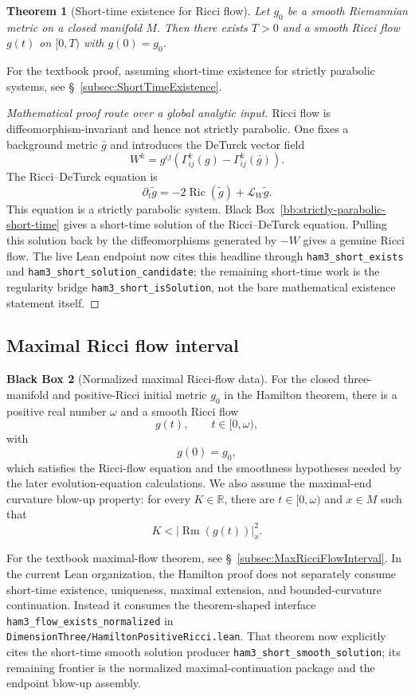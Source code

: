 \documentclass[11pt]{article}
\theoremstyle{plain}
\newtheorem{theorem}{Theorem}[section]
\theoremstyle{definition}
\newtheorem{blackbox}[theorem]{Black Box}
\theoremstyle{remark}
\newcommand{\Ric}{\operatorname{Ric}}
\newcommand{\Rm}{\operatorname{Rm}}
\newcommand{\Lie}{\mathcal L}
\newcommand{\norm}[1]{\left|#1\right|}
\newcommand{\leanref}[1]{\nolinkurl{#1}}
\newcommand{\leanfile}[1]{\nolinkurl{#1}}
\newcommand{\rffile}[1]{\leanfile{#1}}
\begin{document}
\begin{theorem}[Short-time existence for Ricci flow]
\label{thm:rf-short-time-existence}
Let $g_0$ be a smooth Riemannian metric on a closed manifold $M$. Then there
exists $T>0$ and a smooth Ricci flow $g(t)$ on $[0,T)$ with $g(0)=g_0$.
\end{theorem}

For the textbook proof, assuming short-time existence for strictly parabolic
systems, see \S~\ref{subsec:ShortTimeExistence}.

\begin{proof}[Mathematical proof route over a global analytic input]
Ricci flow is diffeomorphism-invariant and hence not strictly parabolic.  One
fixes a background metric $\bar g$ and introduces the DeTurck vector field
\[
W^k
=
g^{ij}\left(\Gamma^k_{ij}(g)-\Gamma^k_{ij}(\bar g)\right).
\]
The Ricci--DeTurck equation is
\[
\partial_t\tilde g
=
-2\Ric(\tilde g)+\Lie_W\tilde g.
\]
This equation is a strictly parabolic system.  Black
Box~\ref{bb:strictly-parabolic-short-time} gives a short-time solution of the
Ricci--DeTurck equation.  Pulling this solution back by the diffeomorphisms
generated by $-W$ gives a genuine Ricci flow.  The live Lean endpoint now cites
this headline through \leanref{ham3_short_exists} and
\leanref{ham3_short_solution_candidate}; the remaining short-time work is the
regularity bridge \leanref{ham3_short_isSolution}, not the bare mathematical
existence statement itself.
\end{proof}

\subsection{Maximal Ricci flow interval}

\begin{blackbox}[Normalized maximal Ricci-flow data]
\label{bb:maximal-rf-interval}
For the closed three-manifold and positive-Ricci initial metric \(g_0\) in the
Hamilton theorem, there is a positive real number \(\omega\) and a smooth
Ricci flow
\[
  g(t),\qquad t\in[0,\omega),
\]
with
\[
  g(0)=g_0,
\]
which satisfies the Ricci-flow equation and the smoothness hypotheses needed by
the later evolution-equation calculations.  We also assume the maximal-end
curvature blow-up property: for every \(K\in\mathbb R\), there are
\(t\in[0,\omega)\) and \(x\in M\) such that
\[
  K<\norm{\Rm(g(t))}^{2}_{x}.
\]
\end{blackbox}

For the textbook maximal-flow theorem, see \S\
\ref{subsec:MaxRicciFlowInterval}.  In the current Lean organization, the
Hamilton proof does not separately consume short-time existence, uniqueness,
maximal extension, and bounded-curvature continuation.  Instead it consumes the
theorem-shaped interface \leanref{ham3_flow_exists_normalized} in
\rffile{DimensionThree/HamiltonPositiveRicci.lean}.  That theorem now explicitly
cites the short-time smooth solution producer \leanref{ham3_short_smooth_solution};
its remaining frontier is the normalized maximal-continuation package and the
endpoint blow-up assembly.
\end{document}
